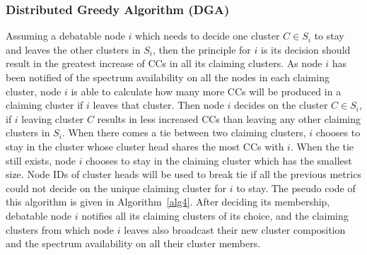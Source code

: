 \documentclass[10pt,journal,compsoc]{IEEEtran}
\theoremstyle{mytheoremstyle}
\theoremstyle{mytheoremstyle}
\theoremstyle{mytheoremstyle}
\newcommand{\ie}{i.e., }
\begin{document}

\subsubsection{Distributed Greedy Algorithm (DGA)}
Assuming a debatable node $i$ which needs to decide one cluster $C\in S_i$ to stay and leaves the other clusters in $S_i$, then the principle for $i$ is its decision should result in the greatest increase of CCs in all its claiming clusters.
As node $i$ has been notified of the spectrum availability on all the nodes in each claiming cluster, node $i$ is able to calculate how many more CCs will be produced in a claiming cluster if $i$ leaves that cluster.
Then node $i$ decides on the cluster $C\in S_i$, if $i$ leaving cluster $C$ results in less increased CCs than leaving any other claiming clusters in $S_i$.
When there comes a tie between two claiming clusters, $i$ chooses to stay in the cluster whose cluster head shares the most CCs with $i$.
When the tie still exists, node $i$ chooses to stay in the claiming cluster which has the smallest size.
Node IDs of cluster heads will be used to break tie if all the previous metrics could not decide on the unique claiming cluster for $i$ to stay.
The pseudo code of this algorithm is given in Algorithm~\ref{alg4}.
After deciding its membership, debatable node $i$ notifies all its claiming clusters of its choice, and the claiming clusters from which node $i$ leaves also broadcast their new cluster composition and the spectrum availability on all their cluster members.
\end{document}
